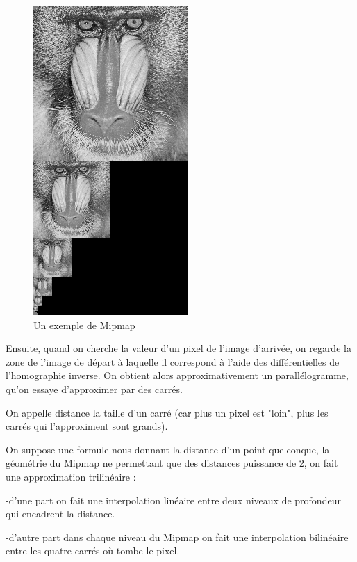 \begin{figure}[h!]
\centering
\caption{Un exemple de Mipmap}
\includegraphics[scale=0.4]{MipMap_real} %
\end{figure}

Ensuite, quand on cherche la valeur d'un pixel de l'image d'arrivée, on regarde la zone de l'image de départ à laquelle il correspond à l'aide des différentielles de l'homographie inverse. On obtient alors approximativement un parallélogramme, qu'on essaye d'approximer par des carrés.


On appelle distance la taille d'un carré (car plus un pixel est "loin", plus les carrés qui l'approximent sont grands). 

On suppose une formule nous donnant la distance d'un point quelconque, la géométrie du Mipmap ne permettant que des distances puissance de 2, on fait une approximation trilinéaire : 

-d'une part on fait une interpolation linéaire entre deux niveaux de profondeur qui encadrent la distance.

-d'autre part dans chaque niveau du Mipmap on fait une interpolation bilinéaire entre les quatre carrés où tombe le pixel.

